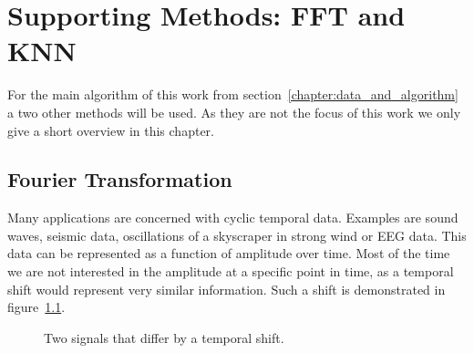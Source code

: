 \chapter{\color{change} Supporting Methods: FFT and KNN \color{black}}
\label{chapter:methodology}

For the main algorithm of this work from section~\ref{chapter:data_and_algorithm} a two other methods will be used. As they are not the focus of this work we only give a short overview \color{change} in this chapter. \color{black}

\section{Fourier Transformation}
\label{sec:fourier_transformation}

Many applications are concerned with cyclic temporal data. \color{change} Examples are sound waves, seismic data, oscillations of a skyscraper in strong wind or EEG data. \color{black} This data can be represented as a function of amplitude over time. Most of the time we are not interested in the amplitude at a specific point in time, as a temporal shift would represent very similar information. Such a shift is demonstrated in figure~\ref{fig:tempoal_shift}.

\begin{figure}
	\centering
	
	\begin{subfigure}[b]{\textwidth}
	\end{subfigure}
	
	\caption{Two signals that differ by a temporal shift.}
	\label{fig:tempoal_shift}
\end{figure}

